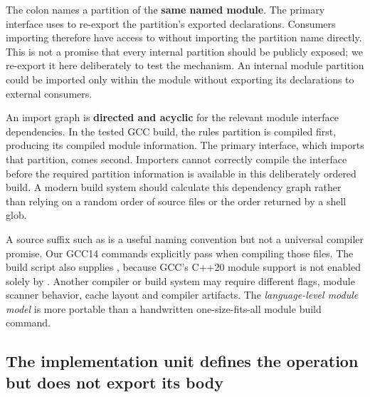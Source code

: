 The colon names a partition of the \textbf{same named module}. The primary interface uses  to re-export the partition's exported declarations. Consumers importing  therefore have access to  without importing the partition name directly. This is not a promise that every internal partition should be publicly exposed; we re-export it here deliberately to test the mechanism. An internal module partition could be imported only within the module without exporting its declarations to external consumers.

An import graph is \textbf{directed and acyclic} for the relevant module interface dependencies. In the tested GCC build, the rules partition is compiled first, producing its compiled module information. The primary interface, which imports that partition, comes second. Importers cannot correctly compile the interface before the required partition information is available in this deliberately ordered build. A modern build system should calculate this dependency graph rather than relying on a random order of source files or the order returned by a shell glob.

A source suffix such as  is a useful naming convention but not a universal compiler promise. Our GCC14 commands explicitly pass  when compiling those files. The build script also supplies , because GCC's C++20 module support is not enabled solely by . Another compiler or build system may require different flags, module scanner behavior, cache layout and compiler artifacts. The \emph{language-level module model} is more portable than a handwritten one-size-fits-all module build command.

\subsection{The implementation unit defines the operation but does not export its body}\label{01-foundations-i-ch006-the-implementation-unit-defines-the-operation-but-does-not-export-its-body}

\hypertarget{01-foundations-i-ch006-the-implementation-unit-defines-the-operation-but-does-not-export-its-body}{}

